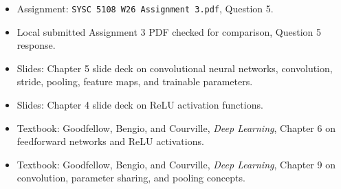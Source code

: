 \documentclass[11pt]{article}
\begin{document}
\begin{itemize}
\item Assignment: \texttt{SYSC 5108 W26 Assignment 3.pdf}, Question 5.
\item Local submitted Assignment 3 PDF checked for comparison, Question 5 response.
\item Slides: Chapter 5 slide deck on convolutional neural networks, convolution, stride, pooling, feature maps, and trainable parameters.
\item Slides: Chapter 4 slide deck on ReLU activation functions.
\item Textbook: Goodfellow, Bengio, and Courville, \textit{Deep Learning}, Chapter 6 on feedforward networks and ReLU activations.
\item Textbook: Goodfellow, Bengio, and Courville, \textit{Deep Learning}, Chapter 9 on convolution, parameter sharing, and pooling concepts.
\end{itemize}
\end{document}
